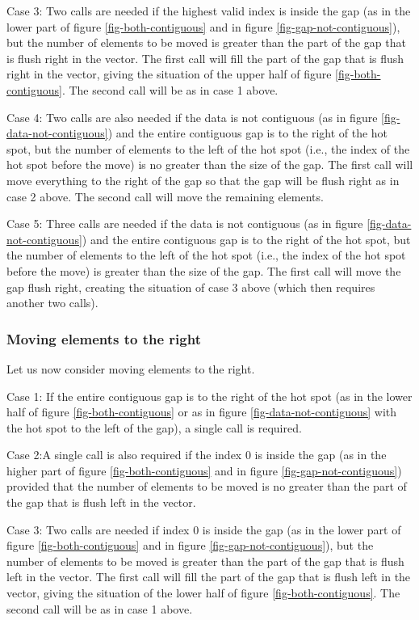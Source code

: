 \documentclass[11pt]{article}
\begin{document}
Case 3: Two calls are needed if the highest valid index is inside the
gap (as in the lower part of figure \ref{fig-both-contiguous} and in
figure \ref{fig-gap-not-contiguous}), but the number of elements to be
moved is greater than the part of the gap that is flush right in the
vector.  The first call will fill the part of the gap that is flush
right in the vector, giving the situation of the upper half of figure
\ref{fig-both-contiguous}.  The second call will be as in case 1
above. 

Case 4: Two calls are also needed if the data is not contiguous (as in
figure \ref{fig-data-not-contiguous}) and the entire contiguous gap is
to the right of the hot spot, but the number of elements to the left
of the hot spot (i.e., the index of the hot spot before the move) is
no greater than the size of the gap.  The first call will move
everything to the right of the gap so that the gap will be flush right
as in case 2 above.  The second call will move the remaining
elements.  

Case 5: Three calls are needed  if the data is not contiguous (as in
figure \ref{fig-data-not-contiguous}) and the entire contiguous gap is
to the right of the hot spot, but the number of elements to the left
of the hot spot (i.e., the index of the hot spot before the move) is
greater than the size of the gap.  The first call will move the gap
flush right, creating the situation of case 3 above (which then
requires another two calls).

\subsubsection{Moving elements to the right}

Let us now consider moving elements to the right.

Case 1: If the entire contiguous gap is to the right of the hot spot
(as in the lower half of figure \ref{fig-both-contiguous} or as in
figure \ref{fig-data-not-contiguous} with the hot spot to the left of
the gap), a single call is required.

Case 2:A single call is also required if the index 0 is
inside the gap (as in the higher part of figure
\ref{fig-both-contiguous} and in figure \ref{fig-gap-not-contiguous})
provided that the number of elements to be moved is no greater than
the part of the gap that is flush left in the vector.

Case 3: Two calls are needed if index 0 is inside the gap (as in the
lower part of figure \ref{fig-both-contiguous} and in figure
\ref{fig-gap-not-contiguous}), but the number of elements to be moved
is greater than the part of the gap that is flush left in the vector.
The first call will fill the part of the gap that is flush left in
the vector, giving the situation of the lower half of figure
\ref{fig-both-contiguous}.  The second call will be as in case 1
above.
\end{document}
